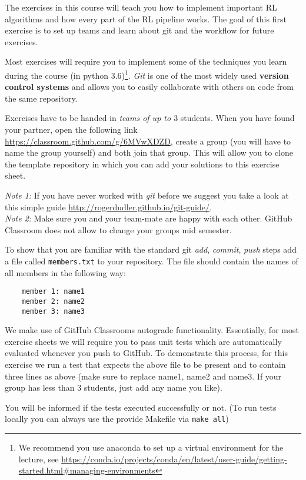 \documentclass{exam}
\begin{document}
\noindent
The exercises in this course will teach you how to implement important RL algorithms and how every part of the RL pipeline works. The goal of this first exercise is to set up teams and learn about git and the workflow for future exercises.

\begin{questions}
	Most exercises will require you to implement some of the techniques you learn during the course (in python 3.6)\footnote{We recommend you use anaconda to set up a virtual environment for the lecture, see \url{https://conda.io/projects/conda/en/latest/user-guide/getting-started.html\#managing-environments}}.
	\emph{Git} is one of the most widely used \textbf{version control systems} and allows you to easily collaborate with others on code from the same repository.
	
    Exercises have to be handed in \emph{teams of up to $3$} students.
    When you have found your partner, open the following link \url{https://classroom.github.com/g/6MVwXDZD}, create a group (you will have to name the group yourself) and both join that group.
    This will allow you to clone the template repository in which you can add your solutions to this exercise sheet.

    \emph{Note 1:} If you have never worked with \emph{git} before we suggest you take a look at this simple guide \url{http://rogerdudler.github.io/git-guide/}.\\
    \emph{Note 2:} Make sure you and your team-mate are happy with each other. GitHub Classroom does not allow to change your groups mid semester. 
	
	To show that you are familiar with the standard git \emph{add}, \emph{commit}, \emph{push} steps add a file called \texttt{members.txt} to your repository.
	The file should contain the names of all members in the following way:
	\begin{verbatim}
	member 1: name1
	member 2: name2
	member 3: name3
	\end{verbatim}
	
	We make use of GitHub Classrooms autograde functionality. Essentially, for most exercise sheets we will require you to pass unit tests which are automatically evaluated whenever you push to GitHub.
	To demonstrate this process, for this exercise we run a test that expects the above file to be present and to contain three lines as above (make sure to replace name1, name2 and name3. If your group has less than 3 students, just add any name you like).

	You will be informed if the tests executed successfully or not.
	(To run tests locally you can always use the provide Makefile via \texttt{make all})
\end{questions}
\end{document}
